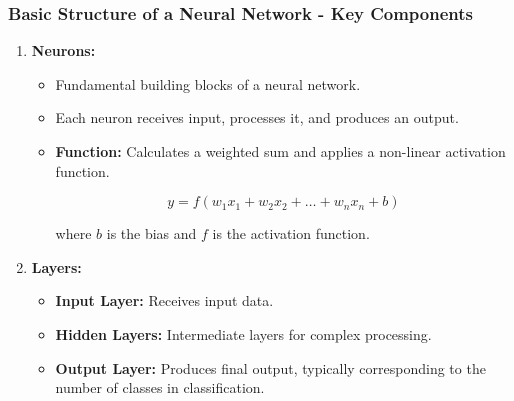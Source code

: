 \documentclass{beamer}
\begin{document}
\begin{frame}[fragile]
    \frametitle{Basic Structure of a Neural Network - Key Components}
    \begin{enumerate}
        \item \textbf{Neurons:}
            \begin{itemize}
                \item Fundamental building blocks of a neural network.
                \item Each neuron receives input, processes it, and produces an output.
                \item \textbf{Function:} Calculates a weighted sum and applies a non-linear activation function.

                \begin{equation}
                    y = f(w_1x_1 + w_2x_2 + \ldots + w_nx_n + b)
                \end{equation}
                
                where \( b \) is the bias and \( f \) is the activation function.
            \end{itemize}
        
        \item \textbf{Layers:}
            \begin{itemize}
                \item \textbf{Input Layer:} Receives input data.
                \item \textbf{Hidden Layers:} Intermediate layers for complex processing.
                \item \textbf{Output Layer:} Produces final output, typically corresponding to the number of classes in classification.
            \end{itemize}
    \end{enumerate}
\end{frame}
\end{document}
